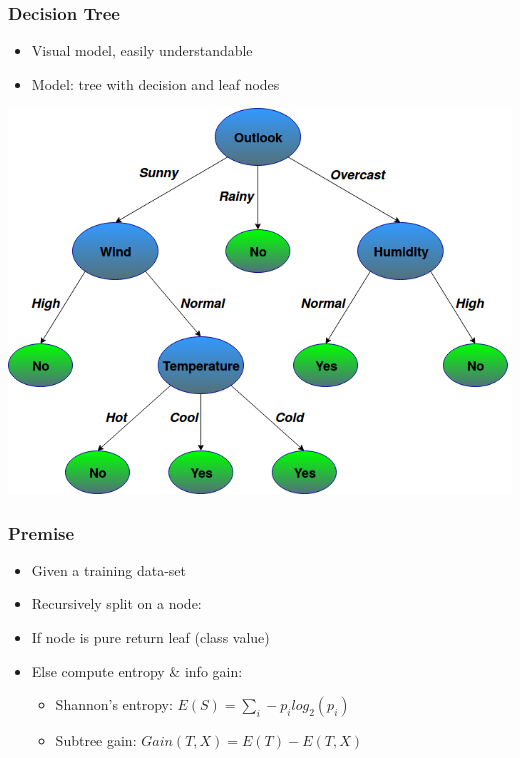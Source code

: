 \documentclass{beamer}
\begin{document}
\begin{frame}
\frametitle{Decision Tree}
	\begin{itemize}
		\item Visual model, easily understandable
		\vfill
		\item Model: tree with \color{blue}decision \color{black}and \color{green}leaf nodes \color{black}
	\end{itemize}
	\begin{center}
		\includegraphics[scale=0.35]{Images/DecisionTree.png}
	\end{center}

\end{frame}

\begin{frame}
\frametitle{Premise}
\begin{itemize}
\item Given a training data-set 
\vfill
\item Recursively split on a node:
\vfill
\item If node is pure return leaf (class value)
\vfill
\item Else compute entropy \& info gain:
\begin{itemize}
\vfill
\item Shannon's entropy: $E(S)= \sum_{i}{} - p_i log_2(p_i) $
\vfill
\item Subtree gain: $Gain(T,X)=E(T)-E(T,X)$
\vfill
\end{itemize}
\end{itemize}
\end{frame}
\end{document}
